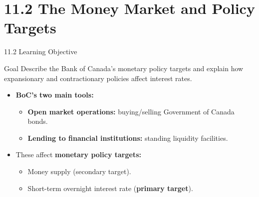 \documentclass[aspectratio=169]{beamer}
\begin{document}
\section{11.2 The Money Market and Policy Targets}

\begin{frame}{11.2 Learning Objective}
\transfade
\begin{block}{Goal}
Describe the Bank of Canada's monetary policy targets and explain how expansionary and contractionary policies affect interest rates.
\end{block}
\begin{itemize}[<+->]
  \item \textbf{BoC's two main tools:}
  \begin{itemize}[<+->]
    \item \textbf{Open market operations:} buying/selling Government of Canada bonds.
    \item \textbf{Lending to financial institutions:} standing liquidity facilities.
  \end{itemize}
  \item These affect \textbf{monetary policy targets:}
  \begin{itemize}[<+->]
    \item Money supply (secondary target).
    \item Short-term overnight interest rate (\textbf{primary target}).
  \end{itemize}
\end{itemize}
\end{frame}
\end{document}
